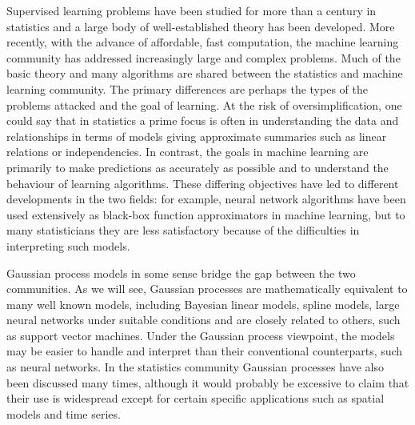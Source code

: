 \documentclass[12pt,a4paper,oneside]{book}
\theoremstyle{plain}
\theoremstyle{definition}
\begin{document}
{\vspace{3mm}\noindent
Supervised learning problems have been studied for more than a century in statistics and a large body of well-established theory has been developed. More recently, with the advance of affordable, fast computation, the machine learning community has addressed increasingly large and complex problems. Much of the basic theory and many algorithms are shared between the statistics and machine learning community. The primary differences are perhaps the types of the problems attacked and the goal of learning. At the risk of oversimplification, one could say that in statistics a prime focus is often in understanding the data and relationships in terms of models giving approximate summaries such as linear relations or independencies. In contrast, the goals in machine learning are primarily to make predictions as accurately as possible and to understand the behaviour of learning algorithms. These differing objectives have led to different developments in the two fields: for example, neural network algorithms have been used extensively as black-box function approximators in machine learning, but to many statisticians they are less satisfactory because of the difficulties in interpreting such models. 

\vspace{3mm}\noindent 
Gaussian process models in some sense bridge the gap between the two communities. As we will see, Gaussian processes are mathematically equivalent to many well known models, including Bayesian linear models, spline models, large neural networks under suitable conditions and are closely related to others, such as support vector machines. Under the Gaussian process viewpoint, the models may be easier to handle and interpret than their conventional counterparts, such as neural networks. In the statistics community Gaussian processes have also been discussed many times, although it would probably be excessive to claim that their use is widespread except for certain specific applications such as spatial models and time series.


 

}
\end{document}
